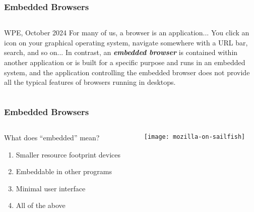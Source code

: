 \documentclass[
	notes=none,
	aspectratio=169
]{beamer}
\begin{document}
\begin{frame}
\frametitle{Embedded Browsers}

\begin{columns}[T]
\begin{column}[T]{1.0\textwidth}
\setlength{\parskip}{0.5em}

\vspace{0.5cm}

\begin{shadequote}[r]{WPE, October 2024}
For many of us, a browser is an application... You click an icon on your graphical operating system, navigate somewhere with a URL bar, search, and so on... In contrast, an \textbf{\textit{embedded browser}} is contained within another application or is built for a specific purpose and runs in an embedded system, and the application controlling the embedded browser does not provide all the typical features of browsers running in desktops.
\end{shadequote}

\end{column}
\end{columns}

\end{frame}


\begin{frame}
\frametitle{Embedded Browsers}

\begin{columns}[T]
\begin{column}[T]{0.55\textwidth}
\setlength{\parskip}{0.5em}

\vspace{1.5cm}
What does ``embedded'' mean?
\begin{enumerate}
\setlength{\parskip}{0.5em}
\item Smaller resource footprint devices
\item Embeddable in other programs
\item Minimal user interface
\item All of the above
\end{enumerate}

\end{column}
\begin{column}[T]{0.37\textwidth}
\setlength{\parskip}{0.5em}

\vspace{1.0cm}
\texttt{[image: mozilla-on-sailfish]}

\end{column}
\end{columns}

\end{frame}
\note{
\begin{enumerate}
\item -
\end{enumerate}
}
\end{document}
